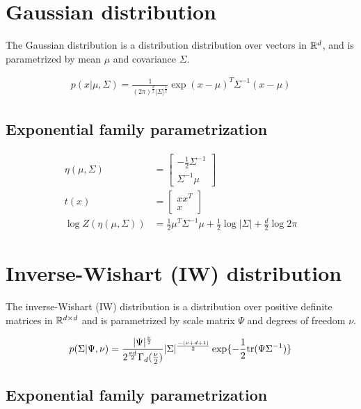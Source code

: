 \section{Gaussian distribution}
\label{sec:stats-gaussian}

The Gaussian distribution is a distribution
distribution over vectors in $\mathbb{R}^d$,
and is parametrized by mean $\mu$ and covariance $\Sigma$.

\begin{align}
        p(x | \mu, \Sigma) = \frac{1}{(2\pi)^{\frac{d}{2}}|\Sigma|^{\frac{1}{2}}} \exp{(x - \mu)^T\Sigma^{-1}(x - \mu)}
\end{align}

\subsection{Exponential family parametrization}

\begin{align*}
    \eta(\mu, \Sigma) &= \begin{bmatrix}-\frac{1}{2}\Sigma^{-1} \\ \Sigma^{-1}\mu\end{bmatrix} \\
    t(x) &= \begin{bmatrix}xx^T \\ x\end{bmatrix} \\
    \log Z(\eta(\mu, \Sigma)) &= \frac{1}{2}\mu^T\Sigma^{-1}\mu + \frac{1}{2}\log |\Sigma| + \frac{d}{2}\log 2\pi
\end{align*}

\section{Inverse-Wishart (IW) distribution}
\label{sec:stats-iw}

The inverse-Wishart (IW) distribution is a
distribution over positive definite matrices in $\mathbb{R}^{d \times d}$
and is parametrized by scale matrix $\Psi$ and degrees of freedom $\nu$.

\begin{align}
        p(\Sigma | \Psi, \nu) = \frac{|\Psi|^{\frac{\nu}{2}}}{2^{\frac{\nu d}{2}}\Gamma_d(\frac{\nu}{2})}|\Sigma|^{\frac{-(\nu + d + 1)}{2}} \exp{-\frac{1}{2}\tr(\Psi\Sigma^{-1})}
\end{align}

\subsection{Exponential family parametrization}

